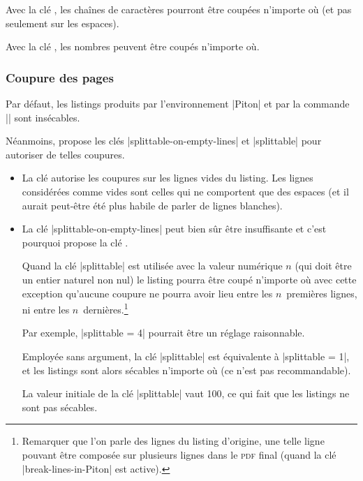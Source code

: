 \documentclass[dvipsnames,svgnames]{article}
\begin{document}
\bigskip
Avec la clé , les chaînes de caractères pourront être
coupées n'importe où (et pas seulement sur les espaces). 


\bigskip
Avec la clé , les nombres peuvent être coupés n'importe où.


\subsubsection{Coupure des pages}

\label{splittable}
\label{coupure-de-pages}


Par défaut, les listings produits par l'environnement |{Piton}| et par la commande
|\PitonInputFile| sont insécables.


Néanmoins,  propose les clés |splittable-on-empty-lines| et |splittable| pour
autoriser de telles coupures.

\begin{itemize}
\item La clé  autorise les coupures sur les lignes
vides du listing. Les lignes considérées comme vides sont celles qui ne comportent que des
espaces (et il aurait peut-être été plus habile de parler de lignes blanches). 

\medskip
\item La clé |splittable-on-empty-lines| peut bien sûr être insuffisante et c'est pourquoi
 propose la clé .

Quand la clé |splittable| est utilisée avec la valeur numérique $n$ (qui doit être un
entier naturel non nul) le listing pourra être coupé n'importe où avec cette exception
qu'aucune coupure ne pourra avoir lieu entre les $n$~premières lignes, ni entre les
$n$~dernières.\footnote{Remarquer que l'on parle des lignes du listing d'origine, une
  telle ligne pouvant être composée sur plusieurs lignes dans le \textsc{pdf} final (quand la
  clé |break-lines-in-Piton| est active).}

Par exemple, |splittable = 4| pourrait être un réglage raisonnable.

Employée sans argument, la clé |splittable| est équivalente à |splittable = 1|, et les
listings sont alors sécables n'importe où (ce n'est pas recommandable).

La valeur initiale de la clé |splittable| vaut 100, ce qui fait que les listings ne sont
pas sécables. 
\end{itemize}
\end{document}

